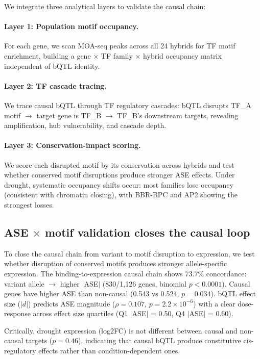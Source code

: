 \documentclass[11pt,a4paper]{article}
\begin{document}
We integrate three analytical layers to validate the causal chain:

\paragraph{Layer 1: Population motif occupancy.}
For each gene, we scan MOA-seq peaks across all 24 hybrids for TF motif
enrichment, building a gene $\times$ TF family $\times$ hybrid occupancy
matrix independent of bQTL identity.

\paragraph{Layer 2: TF cascade tracing.}
We trace causal bQTL through TF regulatory cascades: bQTL disrupts TF\_A
motif $\to$ target gene is TF\_B $\to$ TF\_B's downstream targets, revealing
amplification, hub vulnerability, and cascade depth.

\paragraph{Layer 3: Conservation-impact scoring.}
We score each disrupted motif by its conservation across hybrids and test
whether conserved motif disruptions produce stronger ASE effects. Under
drought, systematic occupancy shifts occur: most families lose occupancy
(consistent with chromatin closing), with BBR-BPC and AP2 showing the
strongest losses.


\subsection{ASE $\times$ motif validation closes the causal loop}
\label{sec:ase}

To close the causal chain from variant to motif disruption to expression, we
test whether disruption of conserved motifs produces stronger allele-specific
expression. The binding-to-expression causal chain shows 73.7\% concordance:
variant allele $\to$ higher $|$ASE$|$ (830/1,126 genes, binomial
$p < 0.0001$). Causal genes have higher ASE than non-causal (0.543 vs 0.524,
$p = 0.034$). bQTL effect size ($|d|$) predicts ASE magnitude
($\rho = 0.107$, $p = 2.2 \times 10^{-6}$) with a clear dose-response
across effect size quartiles (Q1 $|$ASE$|$ = 0.50, Q4 $|$ASE$|$ = 0.60).

Critically, drought expression (log2FC) is not different between causal and
non-causal targets ($p = 0.46$), indicating that causal bQTL produce
constitutive cis-regulatory effects rather than condition-dependent ones.
\end{document}
